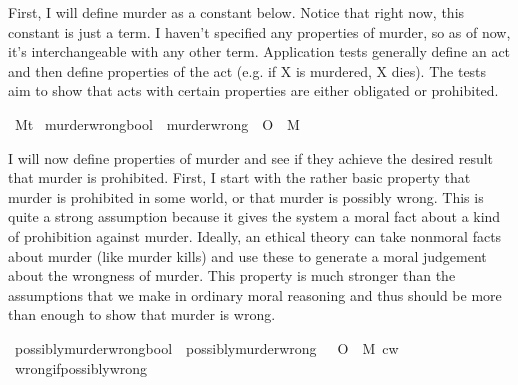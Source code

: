 \begin{isabellebody}
\begin{isamarkuptext}
First, I will define murder as a constant below. Notice that right now, this constant is just a term. 
I haven't specified any properties of murder, so as of now, it's interchangeable with any other term. 
Application tests generally define an act and then define properties of the act (e.g. if X is murdered,
X dies). The tests aim to show that acts with certain properties are either obligated or prohibited.%
\end{isamarkuptext}\isamarkuptrue%
\isamarkupfalse%
\ M{\isacharcolon}{\isacharcolon}{\isachardoublequoteopen}t{\isachardoublequoteclose}\isanewline
{}\isamarkupfalse%
\ murder{\isacharunderscore}wrong{\isacharcolon}{\isacharcolon}{\isachardoublequoteopen}bool{\isachardoublequoteclose}\ \ {\isachardoublequoteopen}murder{\isacharunderscore}wrong\ {\isasymequiv}\ {\isasymTurnstile}{\isacharparenleft}O\ {\isacharbraceleft}\isactrlbold {\isasymnot}\ M{\isacharbraceright}{\isacharparenright}{\isachardoublequoteclose}\isanewline
%
%
\begin{isamarkuptext}%
I will now define properties of murder and see if they achieve the desired result that murder
is prohibited. First, I start with the rather basic property that murder is prohibited in some 
world, or that murder is possibly wrong. This is quite a strong assumption because it gives the system
a moral fact about a kind of prohibition against murder. Ideally, an ethical theory can take nonmoral
facts about murder (like murder kills) and use these to generate a moral judgement about the wrongness of 
murder. This property is much stronger than the assumptions that we make in ordinary moral
reasoning and thus should be more than enough to show that murder is wrong.%
\end{isamarkuptext}\isamarkuptrue%
\isamarkupfalse%
\ possibly{\isacharunderscore}murder{\isacharunderscore}wrong{\isacharcolon}{\isacharcolon}{\isachardoublequoteopen}bool{\isachardoublequoteclose}\ \ {\isachardoublequoteopen}possibly{\isacharunderscore}murder{\isacharunderscore}wrong\ {\isasymequiv}\ {\isacharparenleft}{\isasymdiamond}\ {\isacharparenleft}O\ {\isacharbraceleft}\isactrlbold {\isasymnot}\ M{\isacharbraceright}{\isacharparenright}{\isacharparenright}\ cw{\isachardoublequoteclose}\isanewline
\isanewline
{}\isamarkupfalse%
\ wrong{\isacharunderscore}if{\isacharunderscore}possibly{\isacharunderscore}wrong{\isacharcolon}\isanewline

\end{isabellebody}
